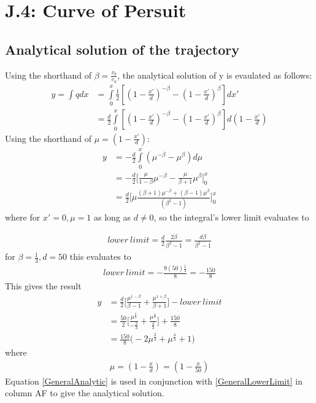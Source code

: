 \documentclass[a4paper, 12pt]{article}
\begin{document}
\section{J.4: Curve of Persuit}
\subsection{Analytical solution of the trajectory}
Using the shorthand of $\beta=\frac{v_b}{v_a}$, the analytical solution of y is evaulated as follows:
\begin{align}
	y= \int q dx &=\int \limits_0^x \frac{1}{2} [(1-\frac{x'}{d})^{-\beta} - (1-\frac{x'}{d})^\beta]  dx' \\
	&=\frac{d}{2} \int\limits_0^x [(1-\frac{x'}{d})^{-\beta} - (1-\frac{x'}{d})^\beta] d(1-\frac{x'}{d})
\end{align}
Using the shorthand of $\mu=(1-\frac{x'}{d})$:
\begin{align}
	y&= -\frac{d}{2} \int\limits_0^x (\mu^{-\beta} - \mu^\beta) d\mu \\
	&= -\frac{d}{2}  \big[ \frac{\mu}{1-\beta} \mu^{-\beta} - \frac{\mu}{\beta+1} \mu^\beta \big]_0^x \\
	&= \frac{d}{2} \big[ \mu \frac{(\beta+1)\mu^{-\beta}+(\beta-1)\mu^\beta}{(\beta^2 -1)} \big]_0^x
\end{align}
where for $x'=0, \mu=1$ as long as $d\neq 0$, so the integral's lower limit evaluates to 
	
\begin{align}
lower\: limit=\frac{d}{2} \frac{2\beta}{\beta^2 -1} = \frac{d\beta}{\beta^2 -1} \label{GeneralLowerLimit}
\end{align}
for $\beta=\frac{1}{3} , d=50$ this evaluates to 
\begin{align}
lower\: limit = -\frac{9(50)\frac{1}{3}}{8} = -\frac{150}{8}
\end{align}
This gives the result
\begin{align}
	y&=\frac{d}{2} \bigg[ \frac{\mu^{1-\beta}} {\beta -1} + \frac{\mu^{1+\beta}} {\beta +1} \bigg] - lower\: limit  \label{GeneralAnalytic}\\
	&= \frac{50}{2} \bigg[ \frac{\mu^{\frac{2}{3}}} {-\frac{2}{3}} + \frac{\mu^{\frac{4}{3}}} {\frac{4}{3}} \bigg] + \frac{150}{8}\\
	&= \frac{150}{8} \bigg( -2\mu^{\frac{2}{3}} + \mu^{\frac{4}{3}} + 1 \bigg)
\end{align}
where
\begin{align}
	\mu=(1-\frac{x}{d})=(1-\frac{x}{50})
\end{align}
Equation \ref{GeneralAnalytic} is used in conjunction with \ref{GeneralLowerLimit} in column AF to give the analytical solution.
\end{document}
